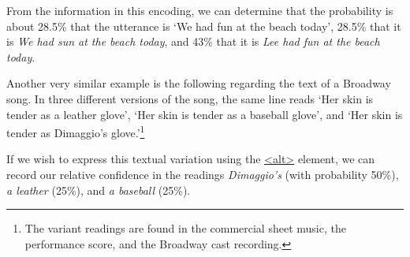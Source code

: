 From the information in this encoding, we can determine that the probability is about 28.5\% that the utterance is ‘We had fun at the beach today’, 28.5\% that it is \textit{We had sun at the beach today}, and 43\% that it is \textit{Lee had fun at the beach today}.\par
Another very similar example is the following regarding the text of a Broadway song. In three different versions of the song, the same line reads ‘Her skin is tender as a leather glove’, ‘Her skin is tender as a baseball glove’, and ‘Her skin is tender as Dimaggio's glove.’\footnote{The variant readings are found in the commercial sheet music, the performance score, and the Broadway cast recording.}\par
If we wish to express this textual variation using the \hyperref[TEI.alt]{<alt>} element, we can record our relative confidence in the readings \textit{Dimaggio's} (with probability 50\%), \textit{a leather} (25\%), and \textit{a baseball} (25\%).\par
